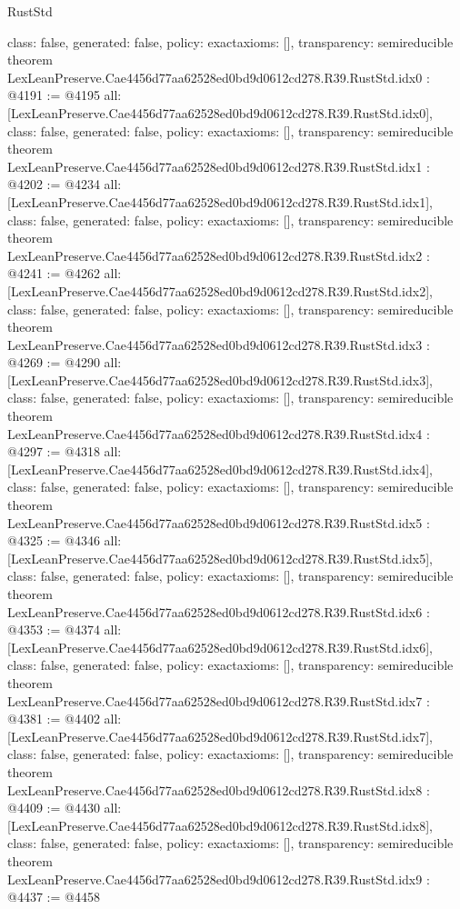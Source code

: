\begin{lexlean}{RustStd}
\begin{coremodule}
{  class: false,
  generated: false,
  policy: exact{axioms: []},
  transparency: semireducible
}
theorem LexLeanPreserve.Cae4456d77aa62528ed0bd9d0612cd278.R39.RustStd.idx0 : @4191 := @4195 {
  all: [LexLeanPreserve.Cae4456d77aa62528ed0bd9d0612cd278.R39.RustStd.idx0],
  class: false,
  generated: false,
  policy: exact{axioms: []},
  transparency: semireducible
}
theorem LexLeanPreserve.Cae4456d77aa62528ed0bd9d0612cd278.R39.RustStd.idx1 : @4202 := @4234 {
  all: [LexLeanPreserve.Cae4456d77aa62528ed0bd9d0612cd278.R39.RustStd.idx1],
  class: false,
  generated: false,
  policy: exact{axioms: []},
  transparency: semireducible
}
theorem LexLeanPreserve.Cae4456d77aa62528ed0bd9d0612cd278.R39.RustStd.idx2 : @4241 := @4262 {
  all: [LexLeanPreserve.Cae4456d77aa62528ed0bd9d0612cd278.R39.RustStd.idx2],
  class: false,
  generated: false,
  policy: exact{axioms: []},
  transparency: semireducible
}
theorem LexLeanPreserve.Cae4456d77aa62528ed0bd9d0612cd278.R39.RustStd.idx3 : @4269 := @4290 {
  all: [LexLeanPreserve.Cae4456d77aa62528ed0bd9d0612cd278.R39.RustStd.idx3],
  class: false,
  generated: false,
  policy: exact{axioms: []},
  transparency: semireducible
}
theorem LexLeanPreserve.Cae4456d77aa62528ed0bd9d0612cd278.R39.RustStd.idx4 : @4297 := @4318 {
  all: [LexLeanPreserve.Cae4456d77aa62528ed0bd9d0612cd278.R39.RustStd.idx4],
  class: false,
  generated: false,
  policy: exact{axioms: []},
  transparency: semireducible
}
theorem LexLeanPreserve.Cae4456d77aa62528ed0bd9d0612cd278.R39.RustStd.idx5 : @4325 := @4346 {
  all: [LexLeanPreserve.Cae4456d77aa62528ed0bd9d0612cd278.R39.RustStd.idx5],
  class: false,
  generated: false,
  policy: exact{axioms: []},
  transparency: semireducible
}
theorem LexLeanPreserve.Cae4456d77aa62528ed0bd9d0612cd278.R39.RustStd.idx6 : @4353 := @4374 {
  all: [LexLeanPreserve.Cae4456d77aa62528ed0bd9d0612cd278.R39.RustStd.idx6],
  class: false,
  generated: false,
  policy: exact{axioms: []},
  transparency: semireducible
}
theorem LexLeanPreserve.Cae4456d77aa62528ed0bd9d0612cd278.R39.RustStd.idx7 : @4381 := @4402 {
  all: [LexLeanPreserve.Cae4456d77aa62528ed0bd9d0612cd278.R39.RustStd.idx7],
  class: false,
  generated: false,
  policy: exact{axioms: []},
  transparency: semireducible
}
theorem LexLeanPreserve.Cae4456d77aa62528ed0bd9d0612cd278.R39.RustStd.idx8 : @4409 := @4430 {
  all: [LexLeanPreserve.Cae4456d77aa62528ed0bd9d0612cd278.R39.RustStd.idx8],
  class: false,
  generated: false,
  policy: exact{axioms: []},
  transparency: semireducible
}
theorem LexLeanPreserve.Cae4456d77aa62528ed0bd9d0612cd278.R39.RustStd.idx9 : @4437 := @4458 {
}
\end{coremodule}
\end{lexlean}
